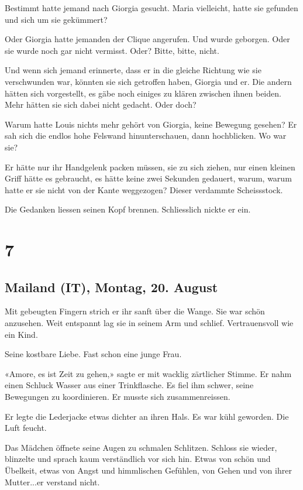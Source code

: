 Bestimmt hatte jemand nach Giorgia gesucht. Maria vielleicht, hatte sie
gefunden und sich um sie gekümmert?

Oder Giorgia hatte jemanden der Clique angerufen. Und wurde geborgen.
Oder sie wurde noch gar nicht vermisst. Oder? Bitte, bitte, nicht.

Und wenn sich jemand erinnerte, dass er in die gleiche Richtung wie sie
verschwunden war, könnten sie sich getroffen haben, Giorgia und er. Die
andern hätten sich vorgestellt, es gäbe noch einiges zu klären zwischen
ihnen beiden. Mehr hätten sie sich dabei nicht gedacht. Oder doch?

Warum hatte Louis nichts mehr gehört von Giorgia, keine Bewegung
gesehen? Er sah sich die endlos hohe Felswand hinunterschauen, dann
hochblicken. Wo war sie?

Er hätte nur ihr Handgelenk packen müssen, sie zu sich ziehen, nur einen
kleinen Griff hätte es gebraucht, es hätte keine zwei Sekunden gedauert,
warum, warum hatte er sie nicht von der Kante weggezogen? Dieser
verdammte Scheissstock.

Die Gedanken liessen seinen Kopf brennen. Schliesslich nickte er ein.

\chapter{7}\label{section-6}

\section{Mailand (IT), Montag, 20.
August}\label{mailand-it-montag-20.-august}

Mit gebeugten Fingern strich er ihr sanft über die Wange. Sie war schön
anzusehen. Weit entspannt lag sie in seinem Arm und schlief.
Vertrauensvoll wie ein Kind.

Seine kostbare Liebe. Fast schon eine junge Frau.

«Amore, es ist Zeit zu gehen,» sagte er mit wacklig zärtlicher Stimme.
Er nahm einen Schluck Wasser aus einer Trinkflasche. Es fiel ihm schwer,
seine Bewegungen zu koordinieren. Er musste sich zusammenreissen.

Er legte die Lederjacke etwas dichter an ihren Hals. Es war kühl
geworden. Die Luft feucht.

Das Mädchen öffnete seine Augen zu schmalen Schlitzen. Schloss sie
wieder, blinzelte und sprach kaum verständlich vor sich hin. Etwas von
schön und Übelkeit, etwas von Angst und himmlischen Gefühlen, von Gehen
und von ihrer Mutter...er verstand nicht.

